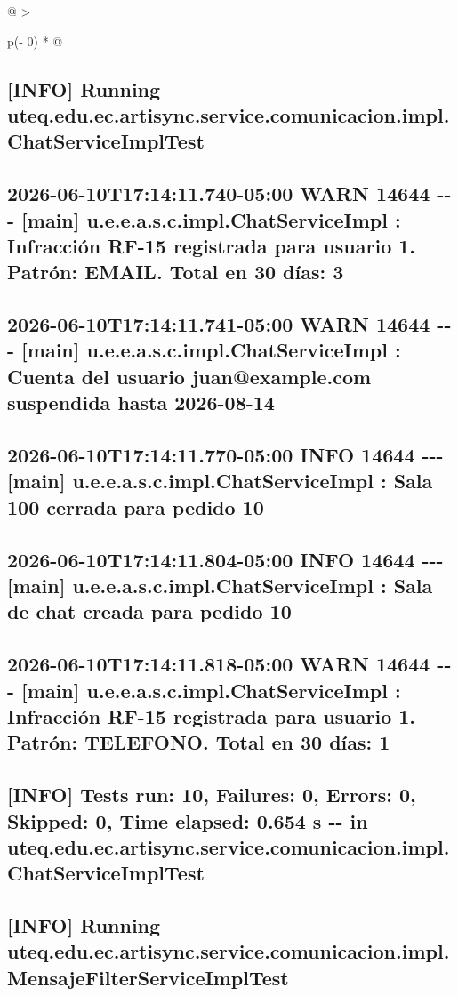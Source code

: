 \documentclass[
]{article}
\begin{document}
\begin{longtable}[]{@{}
  >{\raggedright\arraybackslash}p{(\columnwidth - 0\tabcolsep) * }@{}}
\begin{minipage}[b]{\linewidth}
\subsection{{[}INFO{]} Running
uteq.edu.ec.artisync.service.comunicacion.impl.ChatServiceImplTest}

\subsection{2026-06-10T17:14:11.740-05:00 WARN 14644 -\/-\/- {[}main{]}
u.e.e.a.s.c.impl.ChatServiceImpl : Infracción RF-15 registrada para
usuario 1. Patrón: EMAIL. Total en 30 días:
3}

\subsection{2026-06-10T17:14:11.741-05:00 WARN 14644 -\/-\/- {[}main{]}
u.e.e.a.s.c.impl.ChatServiceImpl : Cuenta del usuario juan@example.com
suspendida hasta
2026-08-14}

\subsection{2026-06-10T17:14:11.770-05:00 INFO 14644 -\/-\/- {[}main{]}
u.e.e.a.s.c.impl.ChatServiceImpl : Sala 100 cerrada para pedido
10}

\subsection{2026-06-10T17:14:11.804-05:00 INFO 14644 -\/-\/- {[}main{]}
u.e.e.a.s.c.impl.ChatServiceImpl : Sala de chat creada para pedido
10}

\subsection{2026-06-10T17:14:11.818-05:00 WARN 14644 -\/-\/- {[}main{]}
u.e.e.a.s.c.impl.ChatServiceImpl : Infracción RF-15 registrada para
usuario 1. Patrón: TELEFONO. Total en 30 días:
1}

\subsection{{[}INFO{]} Tests run: 10, Failures: 0, Errors: 0, Skipped:
0, Time elapsed: 0.654 s -\/- in
uteq.edu.ec.artisync.service.comunicacion.impl.ChatServiceImplTest}

\subsection{{[}INFO{]} Running
uteq.edu.ec.artisync.service.comunicacion.impl.MensajeFilterServiceImplTest}


\end{minipage}
\end{longtable}
\end{document}
